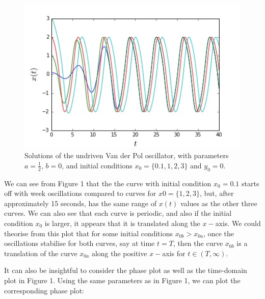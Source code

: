 \documentclass[11pt,a4paper]{amsart}
\begin{document}
\begin{figure}[h]
\caption{Solutions of the undriven Van der Pol oscillator, with parameters $a=\frac{1}{2}$, $b=0$, and initial conditions $x_0=\{0.1,1,2,3\}$ and $y_0=0$.}
\includegraphics[scale=0.6]{part_2a.jpg}
\centering
\end{figure}

We can see from Figure 1 that the the curve with initial condition $x_0=0.1$ starts off with week oscillations compared to curves for $x0=\{1,2,3\}$, but, after approximately 15 seconds, has the same range of $x(t)$ values as the other three curves. We can also see that each curve is periodic, and also if the initial condition $x_0$ is larger, it appears that it is translated along the ${x-}$axis. We could theorise from this plot that for some initial conditions $x_{0b}>x_{0a}$, once the oscillations stabilise for both curves, say at time $t=T$, then the curve $x_{0b}$ is a translation of the curve $x_{0a}$ along the positive ${x-}$axis for $t\in(T,\infty)$. 

It can also be insightful to consider the phase plot as well as the time-domain plot in Figure 1. Using the same parameters as in Figure 1, we can plot the corresponding phase plot: 
\end{document}
